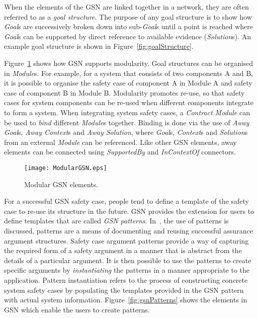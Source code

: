 When the elements of the GSN are linked together in a network, they are often referred to as a \textit{goal structure}. 
The purpose of any goal structure is to show how \textit{Goal}s are successively broken down into sub-\textit{Goal}s until a point is reached where \textit{Goal}s can be supported by direct reference to available evidence (\textit{Solution}s). 
An example goal structure is shown in Figure~\ref{fig:goalStructure}.

Figure~\ref{fig:modularGSN} shows how GSN supports modularity. 
Goal structures can be organised in \textit{Module}s. 
For example, for a system that consists of two components A and B, it is possible to organise the safety case of component A in Module A and safety case of component B in Module B. 
Modularity promotes re-use, so that safety cases for system components can be re-used when different components integrate to form a system. 
When integrating system safety cases, a \textit{Contract Module} can be used to \textit{bind} different \textit{Module}s together. 
Binding is done via the use of \textit{Away Goal}s, \textit{Away Context}s and \textit{Away Solution}, where \textit{Goal}s, \textit{Context}s and \textit{Solution}s from an external \textit{Module} can be referenced. 
Like other GSN elements, away elements can be connected using \textit{SupportedBy} and \textit{InContextOf} connectors.

\begin{figure}
	\centering
	\texttt{[image: ModularGSN.eps]}
	\caption{Modular GSN elements.}
	\label{fig:modularGSN}
\end{figure}
For a successful GSN safety case, people tend to define a template of the safety case to re-use its structure in the future. 
GSN provides the extension for users to define templates that are called \textit{GSN patterns}.
In~\cite{kelly1997safety}, the use of patterns is discussed, patterns are a means of documenting and reusing successful assurance argument structures. 
Safety case argument patterns provide a way of capturing the required form of a safety argument in a manner that is abstract from the details of a particular argument. It is then possible to use the patterns to create specific arguments by \textit{instantiating} the patterns in a manner appropriate to the application. 
Pattern instantiation refers to the process of constructing concrete system safety cases by populating the templates provided in the GSN pattern with actual system information. Figure~\ref{fig:gsnPatterns} shows the elements in GSN which enable the users to create patterns.

